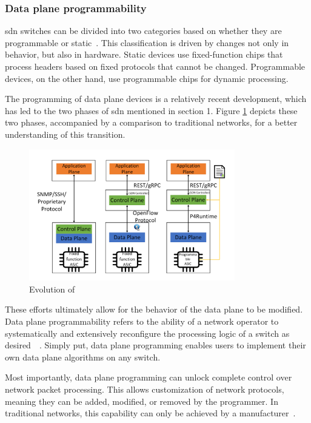 \subsubsection{Data plane programmability}
\gls{sdn} switches can be divided into two categories based on whether they are programmable or static~\cite{peterson_software-defined_2021}. This classification is driven by changes not only in behavior, but also in hardware. Static devices use fixed-function chips that process headers based on fixed protocols that cannot be changed. Programmable devices, on the other hand, use programmable chips for dynamic processing. 

The programming of data plane devices is a relatively recent development, which has led to the two phases of \gls{sdn} mentioned in section 1. Figure \ref{fig:sdn_evolution} depicts these two phases, accompanied by a comparison to traditional networks, for a better understanding of this transition.

\begin{figure}
	\centering
	\includegraphics[width=0.8\textwidth]{Chapters/Figures/SDNs/sdn_evolution.png}
	\caption{Evolution of ~\cite{liatifis_advancing_2023}}
	\label{fig:sdn_evolution}
\end{figure}

These efforts ultimately allow for the behavior of the data plane to be modified. Data plane programmability refers to the ability of a network operator to systematically and extensively reconfigure the processing logic of a switch as desired~\cite{bifulco_survey_2018}~\cite{hauser_survey_2021}. Simply put, data plane programming enables users to implement their own data plane algorithms on any switch. 

Most importantly, data plane programming can unlock complete control over network packet processing. This allows customization of network protocols, meaning they can be added, modified, or removed by the programmer. In traditional networks, this capability can only be achieved by a manufacturer~\cite{hauser_survey_2021}. 

